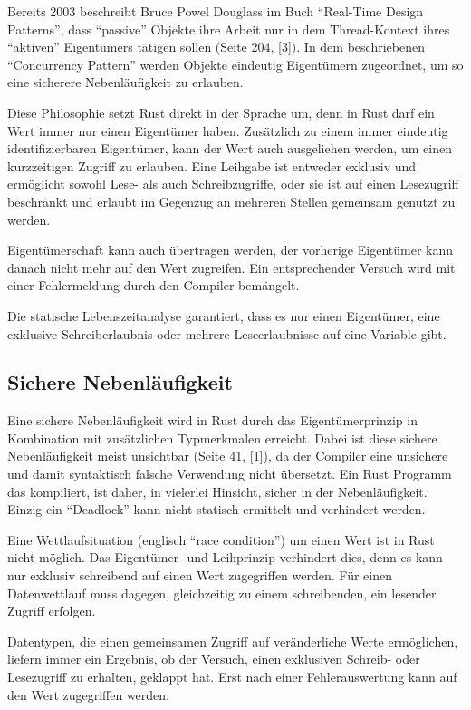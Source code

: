 \begin{multicols}{2}
Bereits 2003 beschreibt Bruce Powel Douglass im Buch \enquote{Real-Time Design Patterns}, dass \enquote{passive} Objekte ihre Arbeit nur in dem Thread-Kontext ihres \enquote{aktiven} Eigentümers tätigen sollen (Seite 204, [3]).
In dem beschriebenen \enquote{Concurrency Pattern} werden Objekte eindeutig Eigentümern zugeordnet, um so eine sicherere Nebenläufigkeit zu erlauben.

Diese Philosophie setzt Rust direkt in der Sprache um, denn in Rust darf ein Wert immer nur einen Eigentümer haben.
Zusätzlich zu einem immer eindeutig identifizierbaren Eigentümer, kann der Wert auch ausgeliehen werden, um einen kurzzeitigen Zugriff zu erlauben.
Eine Leihgabe ist entweder exklusiv und ermöglicht sowohl Lese- als auch Schreibzugriffe, oder sie ist auf einen Lesezugriff beschränkt und erlaubt im Gegenzug an mehreren Stellen gemeinsam genutzt zu werden.

Eigentümerschaft kann auch übertragen werden, der vorherige Eigentümer kann danach nicht mehr auf den Wert zugreifen.
Ein entsprechender Versuch wird mit einer Fehlermeldung durch den Compiler bemängelt.

Die statische Lebenszeitanalyse garantiert, dass es nur einen Eigentümer, eine exklusive Schreiberlaubnis oder mehrere Leseerlaubnisse auf eine Variable gibt.

\subsection*{Sichere Nebenläufigkeit}

Eine sichere Nebenläufigkeit wird in Rust durch das Eigentümerprinzip in Kombination mit zusätzlichen Typmerkmalen erreicht.
Dabei ist diese sichere Nebenläufigkeit meist unsichtbar (Seite 41, [1]), da der Compiler eine unsichere und damit syntaktisch falsche Verwendung nicht übersetzt.
Ein Rust Programm das kompiliert, ist daher, in vielerlei Hinsicht, sicher in der Nebenläufigkeit.
Einzig ein \enquote{Deadlock} kann nicht statisch ermittelt und verhindert werden.

Eine Wettlaufsituation (englisch \enquote{race condition}) um einen Wert ist in Rust nicht möglich.
Das Eigentümer- und Leihprinzip verhindert dies, denn es kann nur exklusiv schreibend auf einen Wert zugegriffen werden.
Für einen Datenwettlauf muss dagegen, gleichzeitig zu einem schreibenden, ein lesender Zugriff erfolgen.

Datentypen, die einen gemeinsamen Zugriff auf veränderliche Werte ermöglichen, liefern immer ein Ergebnis, ob der Versuch, einen exklusiven Schreib- oder Lesezugriff zu erhalten, geklappt hat.
Erst nach einer Fehlerauswertung kann auf den Wert zugegriffen werden.


\end{multicols}
